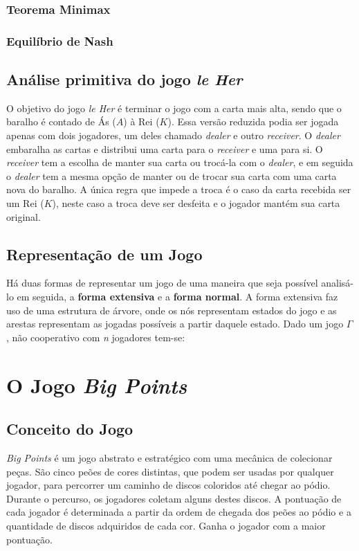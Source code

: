 \subsubsection{Teorema Minimax}
\label{subsubsec:teorema-minimax}

\subsubsection{Equilíbrio de Nash}
\label{subsubsec:equilibrio-de-nash}



\subsection{Análise primitiva do jogo \emph{le Her}}
\label{subsec:analise-primitiva-do-jogo-le-her}

O objetivo do jogo \emph{le Her} é terminar o jogo com a carta mais alta, sendo que o baralho é contado de Ás ($A$) à Rei ($K$). Essa versão reduzida podia ser jogada apenas com dois jogadores, um deles chamado \emph{dealer} e outro \emph{receiver}. O \emph{dealer} embaralha as cartas e distribui uma carta para o \emph{receiver} e uma para si. O \emph{receiver} tem a escolha de manter sua carta ou trocá-la com o \emph{dealer}, e em seguida o \emph{dealer} tem a mesma opção de manter ou de trocar sua carta com uma carta nova do baralho. A única regra que impede a troca é o caso da carta recebida ser um Rei ($K$), neste caso a troca deve ser desfeita e o jogador mantém sua carta original.



\subsection{Representação de um Jogo}
\label{subsec:representacao-de-um-jogo}

Há duas formas de representar um jogo de uma maneira que seja possível analisá-lo em seguida, a \textbf{forma extensiva} e a \textbf{forma normal}. A forma extensiva faz uso de uma estrutura de árvore, onde os nós representam estados do jogo e as arestas representam as jogadas possíveis a partir daquele estado. Dado um jogo $\Gamma$, não cooperativo com \emph{n} jogadores tem-se:


\section{O Jogo \emph{Big Points}}
\subsection{Conceito do Jogo}
\label{subsec:conceito-do-jogo}
\emph{Big Points} é um jogo abstrato e estratégico com uma mecânica de colecionar peças. São cinco peões de cores distintas, que podem ser usadas por qualquer jogador, para percorrer um caminho de discos coloridos até chegar ao pódio. Durante o percurso, os jogadores coletam alguns destes discos. A pontuação de cada jogador é determinada a partir da ordem de chegada dos peões ao pódio e a quantidade de discos adquiridos de cada cor. Ganha o jogador com a maior pontuação.

